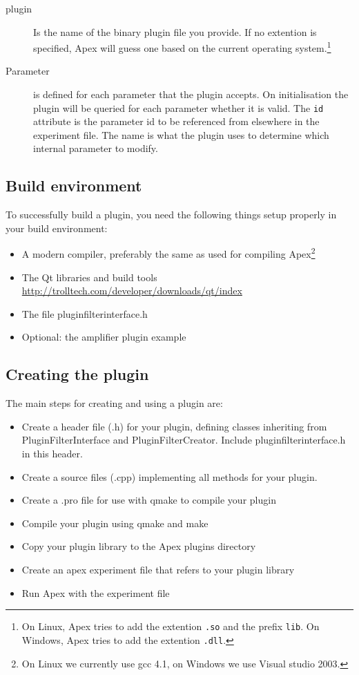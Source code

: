 \begin{description}
 \item[plugin] Is the name of the binary plugin file you provide. If no extention is specified, Apex will guess one based on the current operating system.\footnote{On Linux, Apex tries to add the extention \texttt{.so} and the prefix \texttt{lib}. On Windows, Apex tries to add the extention \texttt{.dll}.}
\item[Parameter] is defined for each parameter that the plugin accepts. On initialisation the plugin will be queried for each parameter whether it is valid. The \texttt{id} attribute is the parameter id to be referenced from elsewhere in the experiment file. The name is what the plugin uses to determine which internal parameter to modify.
\end{description}


\subsection{Build environment}

To successfully build a plugin, you need the following things setup properly in your build environment:

\begin{itemize}
 \item A modern compiler, preferably the same as used for compiling Apex\footnote{On Linux we currently use gcc 4.1, on Windows we use Visual studio 2003.}
\item The Qt libraries and build tools \url{http://trolltech.com/developer/downloads/qt/index}
\item The file pluginfilterinterface.h
\item Optional: the amplifier plugin example
\end{itemize}



\subsection{Creating the plugin}

The main steps for creating and using a plugin are:

\begin{itemize}
 \item Create a header file (.h) for your plugin, defining classes inheriting from PluginFilterInterface and PluginFilterCreator. Include pluginfilterinterface.h in this header.
\item Create a source files (.cpp) implementing all methods for your plugin.
\item Create a .pro file for use with qmake to compile your plugin
\item Compile your plugin using qmake and make
\item Copy your plugin library to the Apex plugins directory
\item Create an apex experiment file that refers to your plugin library
\item Run Apex with the experiment file
\end{itemize}

